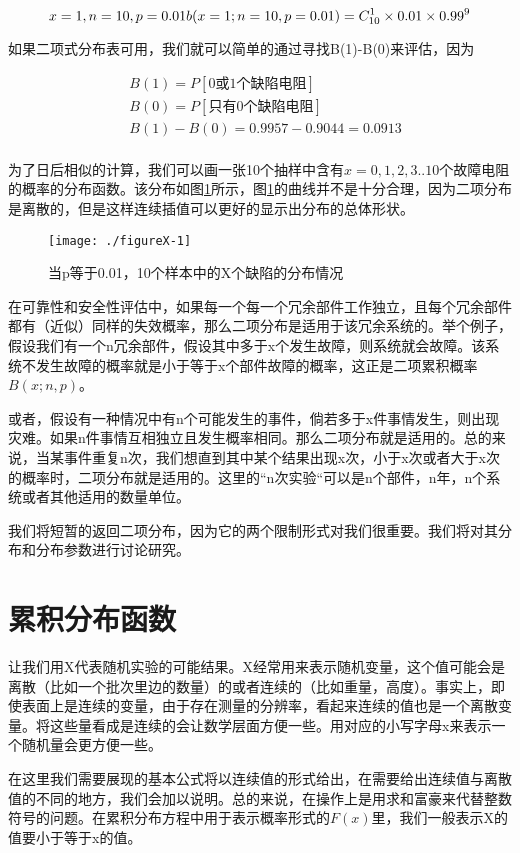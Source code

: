 \documentclass[cn,11pt,chinese]{elegantbook}
\begin{document}
{$$
x=1,n=10,p=0.01 \\
b(x=1;n=10,p=0.01)=C_{10}^1 \times 0.01 \times 0.99^9
$$

如果二项式分布表可用，我们就可以简单的通过寻找B(1)-B(0)来评估，因为


\begin{align*}
&B(1)=P[\mbox{0或1个缺陷电阻}]  \\
&B(0)=P[\mbox{只有0个缺陷电阻}] \\
&B(1)-B(0)=0.9957-0.9044=0.0913  \\
\end{align*}


为了日后相似的计算，我们可以画一张10个抽样中含有$x=0,1,2,3..10$个故障电阻的概率的分布函数。该分布如图\ref{fig10-1}所示，图\ref{fig10-1}的曲线并不是十分合理，因为二项分布是离散的，但是这样连续插值可以更好的显示出分布的总体形状。

\begin{figure}
	\texttt{[image: ./figureX-1]}
	\caption{当p等于0.01，10个样本中的X个缺陷的分布情况}
	\label{fig10-1}
\end{figure}


在可靠性和安全性评估中，如果每一个每一个冗余部件工作独立，且每个冗余部件都有（近似）同样的失效概率，那么二项分布是适用于该冗余系统的。举个例子，假设我们有一个n冗余部件，假设其中多于x个发生故障，则系统就会故障。该系统不发生故障的概率就是小于等于x个部件故障的概率，这正是二项累积概率$B(x;n,p)$。

或者，假设有一种情况中有n个可能发生的事件，倘若多于x件事情发生，则出现灾难。如果n件事情互相独立且发生概率相同。那么二项分布就是适用的。总的来说，当某事件重复n次，我们想直到其中某个结果出现x次，小于x次或者大于x次的概率时，二项分布就是适用的。这里的“n次实验“可以是n个部件，n年，n个系统或者其他适用的数量单位。

我们将短暂的返回二项分布，因为它的两个限制形式对我们很重要。我们将对其分布和分布参数进行讨论研究。

\section{累积分布函数}

让我们用X代表随机实验的可能结果。X经常用来表示随机变量，这个值可能会是离散（比如一个批次里边的数量）的或者连续的（比如重量，高度）。事实上，即使表面上是连续的变量，由于存在测量的分辨率，看起来连续的值也是一个离散变量。将这些量看成是连续的会让数学层面方便一些。用对应的小写字母x来表示一个随机量会更方便一些。

在这里我们需要展现的基本公式将以连续值的形式给出，在需要给出连续值与离散值的不同的地方，我们会加以说明。总的来说，在操作上是用求和富豪来代替整数符号的问题。在累积分布方程中用于表示概率形式的$F(x)$里，我们一般表示X的值要小于等于x的值。

}
\end{document}
